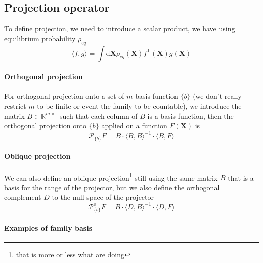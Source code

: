 \documentclass{article}
\numberwithin{equation}{section} %
\newcommand{\vect}[1]{\bm{#1}}
\newcommand{\sprod}[2]{\langle#1,#2\rangle}
\renewcommand{\rm}[1]{\mathrm{#1}}%
\newcommand{\T}{\rm{T}}
\newcommand{\R}{\mathbb{R}} %
\newcommand{\1}{\mathds{1}} %
\newcommand{\dd}{\mathrm{d}} %
\begin{document}
\subsection{Projection operator}
To define projection, we need to introduce a scalar product, we have using equilibrium probability $\rho_{eq}$
\begin{equation}
    \label{eq:scalarproduct}
   \sprod{f}{g} = \int \dd \vect{X} \rho_{eq}(\vect{X}) f^\T(\vect{X}) g(\vect{X})
\end{equation}
\paragraph{Orthogonal projection}
For orthogonal projection onto a set of $m$ basis function $\{b\}$ (we don't really restrict $m$ to be finite or event the family to be countable), we introduce the matrix $B \in \R^{m\times \cdot}$ such that each column of $B$ is a basis function, then the orthogonal projection onto $\{b\}$ applied on a function $F(\vect{X})$ is 
\begin{equation}
    \label{eq:ortho_proj}
    \mathcal{P}_{\{b\}}F = B\cdot\sprod{B}{B}^{-1} \cdot\sprod{B}{F}
\end{equation}

\paragraph{Oblique projection}
We can also define an oblique projection\footnote{that is more or less what \cite{Meyer2017} are doing} still using the same matrix $B$ that is a basis for the range of the projector, but we also define the orthogonal complement $D$ to the null space of the projector
\begin{equation}
    \label{eq:oblique_proj}
    \mathcal{P}^o_{\{b\}}F = B\cdot\sprod{D}{B}^{-1} \cdot\sprod{D}{F}
\end{equation}
\paragraph{Examples of family basis}
\end{document}
